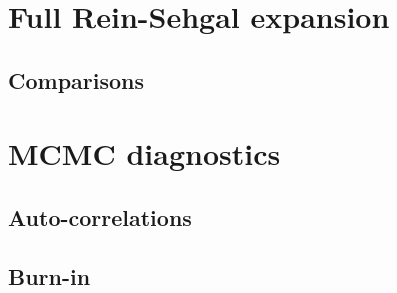 \chapter{Full Rein-Sehgal expansion}
\label{app:RS_ej}

\section{Comparisons}

\chapter{MCMC diagnostics}
\section{Auto-correlations}
\section{Burn-in}